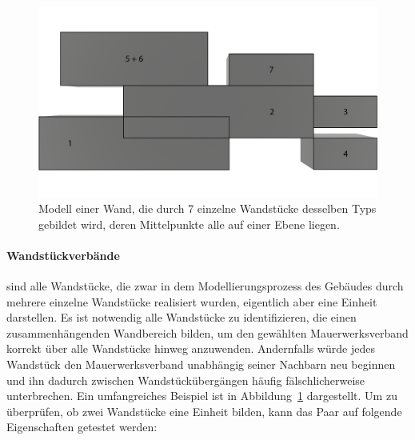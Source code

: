 \begin{figure}[ht]
    \centering
    \includegraphics[width=0.8\columnwidth]{fig/Real_Combination_Base_labeled.png}
    \caption{Modell einer Wand, die durch 7 einzelne Wandstücke desselben Typs gebildet wird, deren Mittelpunkte alle auf einer Ebene liegen.}\label{fig:concept:combination_example_base}
\end{figure}

\paragraph*{Wandstückverbände}\label{concept:combination_properties} sind alle Wandstücke,  die zwar in dem Modellierungsprozess des Gebäudes durch mehrere einzelne Wandstücke realisiert wurden, eigentlich aber eine Einheit darstellen. 
Es ist notwendig alle Wandstücke zu identifizieren, die einen zusammenhängenden Wandbereich bilden, um den gewählten Mauerwerksverband korrekt über alle Wandstücke hinweg anzuwenden.
Andernfalls würde jedes Wandstück den Mauerwerksverband unabhängig seiner Nachbarn neu beginnen und ihn dadurch zwischen Wandstückübergängen häufig fälschlicherweise unterbrechen.
Ein umfangreiches Beispiel ist in Abbildung~\ref*{fig:concept:combination_example_base} dargestellt.
Um zu überprüfen, ob zwei Wandstücke eine Einheit bilden, kann das Paar auf folgende Eigenschaften getestet werden:

